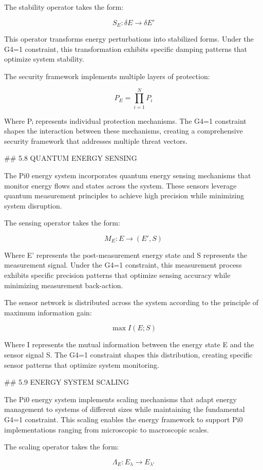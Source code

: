 The stability operator takes the form:

$$S_E: \delta E \rightarrow \delta E'$$

This operator transforms energy perturbations into stabilized forms. Under the G4=1 constraint, this transformation exhibits specific damping patterns that optimize system stability.

The security framework implements multiple layers of protection:

$$P_E = \prod_{i=1}^{N} P_i$$

Where Pᵢ represents individual protection mechanisms. The G4=1 constraint shapes the interaction between these mechanisms, creating a comprehensive security framework that addresses multiple threat vectors.

## 5.8 QUANTUM ENERGY SENSING

The Pi0 energy system incorporates quantum energy sensing mechanisms that monitor energy flows and states across the system. These sensors leverage quantum measurement principles to achieve high precision while minimizing system disruption.

The sensing operator takes the form:

$$M_E: E \rightarrow (E', S)$$

Where E' represents the post-measurement energy state and S represents the measurement signal. Under the G4=1 constraint, this measurement process exhibits specific precision patterns that optimize sensing accuracy while minimizing measurement back-action.

The sensor network is distributed across the system according to the principle of maximum information gain:

$$\max I(E; S)$$

Where I represents the mutual information between the energy state E and the sensor signal S. The G4=1 constraint shapes this distribution, creating specific sensor patterns that optimize system monitoring.

## 5.9 ENERGY SYSTEM SCALING

The Pi0 energy system implements scaling mechanisms that adapt energy management to systems of different sizes while maintaining the fundamental G4=1 constraint. This scaling enables the energy framework to support Pi0 implementations ranging from microscopic to macroscopic scales.

The scaling operator takes the form:

$$\Lambda_E: E_{\lambda} \rightarrow E_{\lambda'}$$

